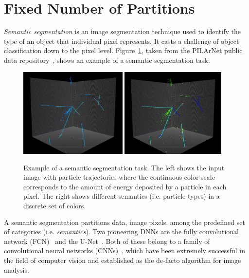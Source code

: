 \documentclass{ws-rv9x6}
\begin{document}
\section{Fixed Number of Partitions}
{\it Semantic segmentation} is an image segmentation technique used to identify the type of an object that individual pixel represents. It casts a challenge of object classification down to the pixel level. Figure~\ref{fig:clustering:segmentation}, taken from the PILArNet public data repository~\cite{adams2020pilarnet}, shows an example of a semantic segmentation task.
\begin{figure}[t]
\centering
\includegraphics[width=0.48\textwidth]{figures/demo-data.pdf}
\includegraphics[width=0.47\textwidth]{figures/demo-label.pdf}
\caption{Example of a semantic segmentation task. The left shows the input image with particle trajectories where the continuous color scale corresponds to the amount of energy deposited by a particle in each pixel. The right shows different semantics (i.e. particle types) in a discrete set of colors.}
\label{fig:clustering:segmentation}
\end{figure}
A semantic segmentation partitions data, image pixels, among the predefined set of categories (i.e. {\it semantics}). Two pioneering DNNs are the fully convolutional network (FCN)~\cite{long2014fully} and the U-Net~\cite{ronneberger2015unet}. Both of these belong to a family of convolutional neural networks (CNNs)~\cite{Fukushima1999,LeCun1999,NIPS2012_4824}, which have been extremely successful in the field of computer vision and established as the de-facto algorithm for image analysis. 
\end{document}

